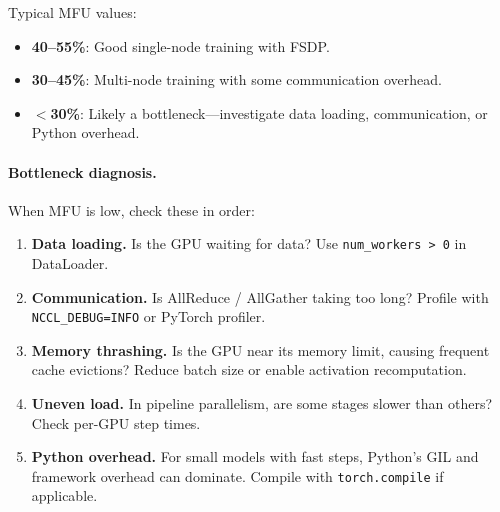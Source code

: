 Typical MFU values:
\begin{itemize}[nosep]
  \item \textbf{40--55\%}: Good single-node training with FSDP.
  \item \textbf{30--45\%}: Multi-node training with some communication overhead.
  \item \textbf{$<$30\%}: Likely a bottleneck---investigate data loading, communication, or Python overhead.
\end{itemize}

\paragraph{Bottleneck diagnosis.} When MFU is low, check these in order:
\begin{enumerate}[nosep]
  \item \textbf{Data loading.} Is the GPU waiting for data? Use \texttt{num\_workers > 0} in DataLoader.
  \item \textbf{Communication.} Is AllReduce / AllGather taking too long? Profile with \texttt{NCCL\_DEBUG=INFO} or PyTorch profiler.
  \item \textbf{Memory thrashing.} Is the GPU near its memory limit, causing frequent cache evictions? Reduce batch size or enable activation recomputation.
  \item \textbf{Uneven load.} In pipeline parallelism, are some stages slower than others? Check per-GPU step times.
  \item \textbf{Python overhead.} For small models with fast steps, Python's GIL and framework overhead can dominate. Compile with \texttt{torch.compile} if applicable.
\end{enumerate}

\noindent{}


